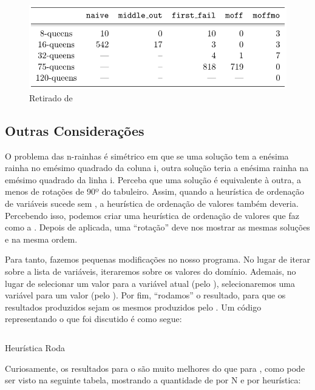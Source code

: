 \documentclass{article}
\begin{document}
\begin{figure}[h]
  \caption{Retirado de \cite{krzysztof}}\label{fig:psi}
  \centering
  \includegraphics[scale=0.5]{HeuristicsBacktrack.png}
\end{figure}

\subsection{Outras Considerações}

O problema das n-rainhas é simétrico em que se uma solução tem a enésima rainha no emésimo quadrado da
coluna i, outra solução teria a enésima rainha na emésimo quadrado da linha i. Perceba que uma solução é
equivalente à outra, a menos de rotações de 90º do tabuleiro. Assim, quando a heurística de ordenação de
variáveis  sucede sem , a heurística de ordenação de
valores  também deveria. Percebendo isso, podemos criar uma heurística
de ordenação de valores que faz  como a . Depois de
aplicada, uma ``rotação'' deve nos mostrar as mesmas soluções e na mesma ordem.

Para tanto, fazemos pequenas modificações no nosso programa. No lugar de iterar sobre a lista de
variáveis, iteraremos sobre os valores do domínio. Ademais, no lugar de selecionar um valor para a
variável atual (pelo ), selecionaremos uma variável para um valor (pelo
). Por fim, ``rodamos'' o resultado, para que os resultados produzidos sejam os
mesmos produzidos pelo . Um código representando o que foi discutido é como
segue:

    \begin{listing}
\inputminted{prolog}{../Exemplos/Cap11/prog7_queensHeurRotate.ecl}
    \caption{Heurística Roda}
    \end{listing}

Curiosamente, os resultados para o  são muito melhores do que para
, como pode ser visto na seguinte tabela, mostrando a quantidade de
 por N e por heurística:
\end{document}
